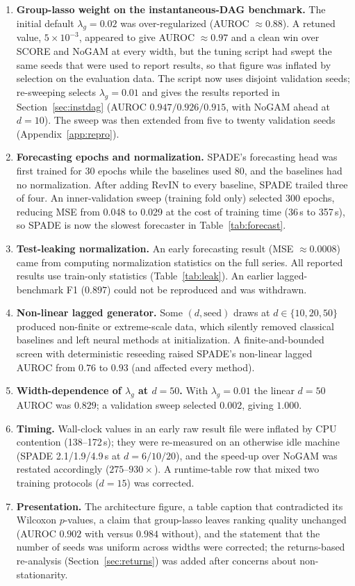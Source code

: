 \begin{enumerate}[leftmargin=*, itemsep=2pt]
\item \textbf{Group-lasso weight on the instantaneous-DAG benchmark.} The
initial default $\lambda_g{=}0.02$ was over-regularized (AUROC $\approx0.88$). A
retuned value, $5\times10^{-3}$, appeared to give AUROC $\approx0.97$ and
a clean win over SCORE and NoGAM at every width, but the tuning script had swept
the same seeds that were used to report results, so that figure was inflated by
selection on the evaluation data. The script now uses disjoint validation seeds;
re-sweeping selects $\lambda_g{=}0.01$ and gives the results reported in
Section~\ref{sec:instdag} (AUROC $0.947/0.926/0.915$, with NoGAM ahead at
$d{=}10$). The sweep was then extended from five to twenty validation seeds
(Appendix~\ref{app:repro}).
\item \textbf{Forecasting epochs and normalization.} SPADE's forecasting head
was first trained for 30 epochs while the baselines used 80, and the baselines
had no normalization. After adding RevIN to every baseline, SPADE trailed three
of four. An inner-validation sweep (training fold only) selected 300 epochs,
reducing MSE from 0.048 to 0.029 at the cost of training time (36\,s to 357\,s),
so SPADE is now the slowest forecaster in Table~\ref{tab:forecast}.
\item \textbf{Test-leaking normalization.} An early forecasting result (MSE
$\approx0.0008$) came from computing normalization statistics on the full series.
All reported results use train-only statistics (Table~\ref{tab:leak}). An
earlier lagged-benchmark F1 ($0.897$) could not be reproduced and was withdrawn.
\item \textbf{Non-linear lagged generator.} Some $(d,\text{seed})$ draws at
$d\in\{10,20,50\}$ produced non-finite or extreme-scale data, which silently
removed classical baselines and left neural methods at initialization. A
finite-and-bounded screen with deterministic reseeding raised SPADE's
non-linear lagged AUROC from $0.76$ to $0.93$ (and affected every method).
\item \textbf{Width-dependence of $\lambda_g$ at $d{=}50$.} With $\lambda_g{=}0.01$
the linear $d{=}50$ AUROC was $0.829$; a validation sweep selected $0.002$, giving
$1.000$.
\item \textbf{Timing.} Wall-clock values in an early raw result file were
inflated by CPU contention (138--172\,s); they were re-measured on an otherwise
idle machine (SPADE 2.1/1.9/4.9\,s at $d{=}6/10/20$), and the speed-up over NoGAM
was restated accordingly ($275$--$930\times$). A runtime-table row that mixed two
training protocols ($d{=}15$) was corrected.
\item \textbf{Presentation.} The architecture figure, a table caption that
contradicted its Wilcoxon $p$-values, a claim that group-lasso leaves ranking
quality unchanged (AUROC $0.902$ with versus $0.984$ without), and the statement
that the number of seeds was uniform across widths were corrected; the
returns-based re-analysis (Section~\ref{sec:returns}) was added after concerns
about non-stationarity.
\end{enumerate}
